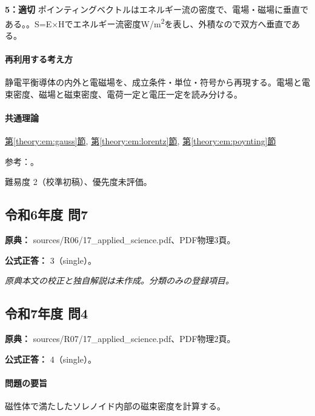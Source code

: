 \noindent\textbf{5：適切} ポインティングベクトルはエネルギー流の密度で、電場・磁場に垂直である。。S=\allowbreak{}E×Hでエネルギー流密度W/m\textsuperscript{2}を表し、外積なので双方へ垂直である。\par

\paragraph{再利用する考え方} 静電平衡導体の内外と電磁場を、成立条件・単位・符号から再現する。電場と電束密度、磁場と磁束密度、電荷一定と電圧一定を読み分ける。

\paragraph{共通理論} \hyperref[theory:em:gauss]{第\ref*{theory:em:gauss}節}, \hyperref[theory:em:lorentz]{第\ref*{theory:em:lorentz}節}, \hyperref[theory:em:poynting]{第\ref*{theory:em:poynting}節}

\par 参考：\cite{mit_em04,mit_em13,mit_lorentz}。

\par 難易度 2（校準初稿）、優先度未評価。

\subsection{令和6年度 問7}
\label{q:r06-reg-applied-07}

\noindent\textbf{原典：} sources/R06/17\_applied\_science.pdf、PDF物理3頁。

\textbf{公式正答：} 3（single）。

\par\textit{原典本文の校正と独自解説は未作成。分類のみの登録項目。}

\subsection{令和7年度 問4}
\label{q:r07-reg-applied-04}

\noindent\textbf{原典：} sources/R07/17\_applied\_science.pdf、PDF物理2頁。

\textbf{公式正答：} 4（single）。

\paragraph{問題の要旨} 磁性体で満たしたソレノイド内部の磁束密度を計算する。

